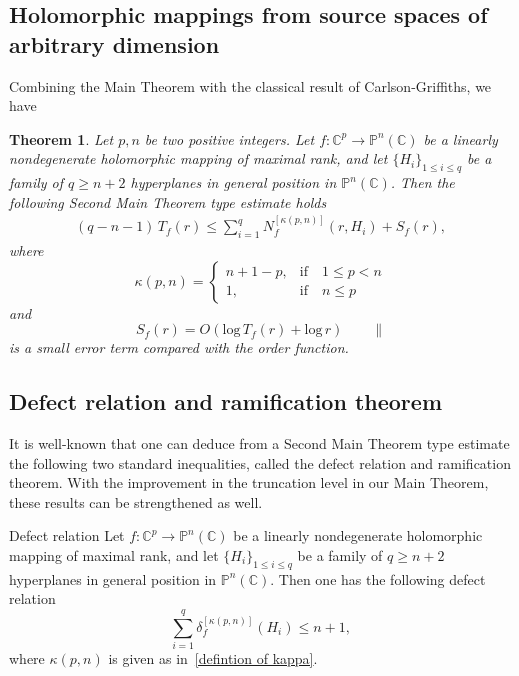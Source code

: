 \documentclass[english, 12pt]{amsart}
\def\log{\mathrm{log}\,}
\theoremstyle{plain}
\newtheorem{thm}{Theorem}[section]
\theoremstyle{remark}
\numberwithin{equation}{section}
\theoremstyle{plain}
\newcommand{\thistheoremname}{}
\newtheorem*{genericthm*}{\thistheoremname}
\newenvironment{namedthm*}[1]{\renewcommand{\thistheoremname}{#1}%
	\begin{genericthm*}}
	{\end{genericthm*}}
\theoremstyle{named}
\begin{document}
\subsection{Holomorphic mappings from source spaces of arbitrary dimension}
Combining the Main Theorem with the classical result of Carlson-Griffiths, we have
\begin{thm} 
\label{arbitrary dimension}	
Let $p,n$ be two positive integers.
	Let $f:\mathbb{C}^p\rightarrow\mathbb{P}^n(\mathbb{C})$ be a linearly nondegenerate  holomorphic mapping of maximal rank, and let $\{H_i\}_{1\leq i\leq q}$ be a family of $q\geq n+2$ hyperplanes in general position in $\mathbb{P}^n(\mathbb{C})$. Then the following Second Main Theorem type estimate holds
	\begin{align}
	(
	q
	-
	n-1
	)\,
	T_{f}(r)\leq\sum_{i=1}^q N_{f}^{[\kappa(p,n)]}(r,H_i)
	+
	S_{f}(r),
	\end{align}
	where
	\begin{equation}
	\label{defintion of kappa}
	\kappa(p,n)=
	\begin{cases}
	n+1-p,&\text{if}\quad 1\leq p< n\\
	1,&\text{if} \quad n\leq p
	\end{cases}
	\end{equation}
and
	$$S_f(r)=O(\log T_f(r)+\log r)\qquad\parallel
	$$ is a small error term compared with the order function.
	
\end{thm}
\subsection{Defect relation and ramification theorem}
It is well-known that one can deduce from a Second Main Theorem type estimate  the following two standard inequalities, called the defect relation and ramification theorem. With the improvement in the truncation level in our Main Theorem, these results can be strengthened as well.
\begin{namedthm*}{Defect relation}
Let $f:\mathbb{C}^p\rightarrow\mathbb{P}^n(\mathbb{C})$ be a linearly nondegenerate  holomorphic mapping of maximal rank, and let $\{H_i\}_{1\leq i\leq q}$ be a family of $q\geq n+2$ hyperplanes in general position in $\mathbb{P}^n(\mathbb{C})$. Then one has the following defect relation
\begin{equation}
\label{defect relation}
\sum_{i=1}^q \delta_{f}^{[\kappa(p,n)]}(H_i)
\leq
n+1,
\end{equation}
where $\kappa(p,n)$ is given as in~\eqref{defintion of kappa}.
\end{namedthm*}
	
\end{document}
